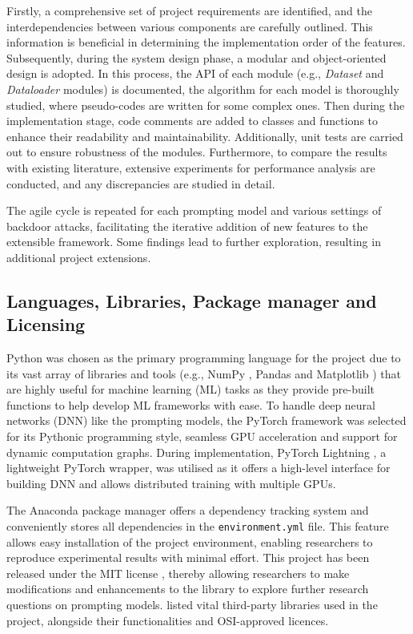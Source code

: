 Firstly, a comprehensive set of project requirements are identified, and the interdependencies between various components are carefully outlined. This information is beneficial in determining the implementation order of the features. Subsequently, during the system design phase, a modular and object-oriented design is adopted. In this process, the API of each module (e.g., \textit{Dataset} and \textit{Dataloader} modules) is documented, the algorithm for each model is thoroughly studied, where pseudo-codes are written for some complex ones. Then during the implementation stage, code comments are added to classes and functions to enhance their readability and maintainability. Additionally, unit tests are carried out to ensure robustness of the modules. Furthermore, to compare the results with existing literature, extensive experiments for performance analysis are conducted, and any discrepancies are studied in detail.  

The agile cycle is repeated for each prompting model and various settings of backdoor attacks, facilitating the iterative addition of new features to the extensible framework. Some findings lead to further exploration, resulting in additional project extensions. 

\subsection{Languages, Libraries, Package manager and Licensing}
Python was chosen as the primary programming language for the project due to its vast array of libraries and tools (e.g., NumPy \cite{Harris20NumPy}, Pandas \cite{mckinney10Pandas} and Matplotlib \cite{Hunter07Matplotlib}) that are highly useful for machine learning (ML) tasks as they provide pre-built functions to help develop ML frameworks with ease. To handle deep neural networks (DNN) like the prompting models, the PyTorch \cite{Paszke19PyTorch} framework was selected for its Pythonic programming style, seamless GPU acceleration and support for dynamic computation graphs. During implementation, PyTorch Lightning \cite{Falcon19PL}, a lightweight PyTorch wrapper, was utilised as it offers a high-level interface for building DNN and allows distributed training with multiple GPUs. 

The Anaconda \cite{anaconda20pack} package manager offers a dependency tracking system and conveniently stores all dependencies in the \texttt{environment.yml} file. This feature allows easy installation of the project environment, enabling researchers to reproduce experimental results with minimal effort. This project has been released under the MIT license \cite{MITLicense}, thereby allowing researchers to make modifications and enhancements to the library to explore further research questions on prompting models.  listed vital third-party libraries used in the project, alongside their functionalities and OSI-approved \cite{OSI} licences.


